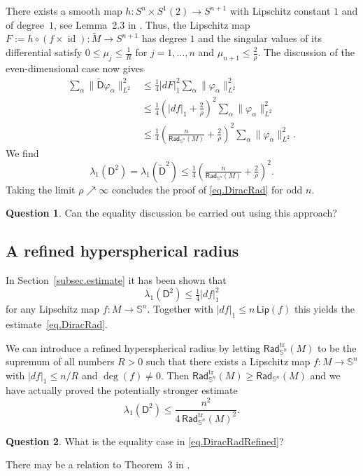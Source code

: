 \documentclass[11pt,reqno]{amsart}
\newcommand{\RadSn}{\mathsf{Rad}_{\Sn}}
\newcommand{\Lip}{\mathsf{Lip}}
\newcommand{\Sn}{\mathbb{S}^n}
\newcommand{\tr}{\mathrm{tr}}
\newcommand{\D}{\mathsf{D}}
\renewcommand{\phi}{\varphi}
\newcommand{\<}{\langle}
\renewcommand{\>}{\rangle}
\DeclareMathOperator{\id}{\mathrm{id}}
\theoremstyle{definition}
\newtheorem{question}{Question}
\begin{document}
There exists a smooth map $h\colon S^n\times S^1(2)\to S^{n+1}$ with Lipschitz constant $1$ and of degree~$1$, see Lemma~2.3 in \cite{BBHW}.
Thus, the Lipschitz map $F:=h\circ(f\times\id)\colon \tilde{M}\to S^{n+1}$ has degree $1$ and the singular values of its differential satisfy $0\le \mu_j\le \frac{1}{R}$ for $j=1,\dots,n$ and $\mu_{n+1}\le\frac{2}{\rho}$.
The discussion of the even-dimensional case now gives
\begin{align*}
\sum_\alpha \|\tilde{\D} \phi_\alpha\|_{L^2}^2
&\le
\tfrac14|dF|_1^2 \sum_\alpha \|\phi_\alpha\|_{L^2}^2 \\
&\le
\tfrac14(|df|_1+\tfrac{2}{\rho})^2 \sum_\alpha \|\phi_\alpha\|_{L^2}^2 \\
&\le
\tfrac14(\tfrac{n}{\RadSn(M)}+\tfrac{2}{\rho})^2 \sum_\alpha \|\phi_\alpha\|_{L^2}^2 .
\end{align*}
We find
$$
\lambda_1(\D^2)
=
\lambda_1(\tilde{\D}^2)
\le
\tfrac14(\tfrac{n}{\RadSn(M)}+\tfrac{2}{\rho})^2 .
$$
Taking the limit $\rho\nearrow \infty$ concludes the proof of \eqref{eq.DiracRad} for odd $n$.

\begin{question}
Can the equality discussion be carried out using this approach?
\end{question}

\subsection{A refined hyperspherical radius}

In Section~\ref{subsec.estimate} it has been shown that 
$$
\lambda_1(\D^2) \le \tfrac14 |df|_1^2 
$$
for any Lipschitz map $f\colon M\to\Sn$.
Together with $|df|_1 \le n\,\Lip(f)$ this yields the estimate~\eqref{eq.DiracRad}.

We can introduce a refined hyperspherical radius by letting $\RadSn^\tr(M)$ to be the supremum of all numbers $R>0$ such that there exists a Lipschitz map $f\colon M\to \Sn$ with $|df|_1\le n/R$ and $\deg(f)\neq0$.
Then $\RadSn^\tr(M)\ge\RadSn(M)$ and we have actually proved the potentially stronger estimate
\begin{equation}
\lambda_1(\D^2) \le \frac{n^2}{4\,\RadSn^\tr(M)^2}.
\label{eq.DiracRadRefined}
\end{equation}
\begin{question}
What is the equality case in \eqref{eq.DiracRadRefined}?
\end{question}

There may be a relation to Theorem~3 in \cite{Li}.
\end{document}
